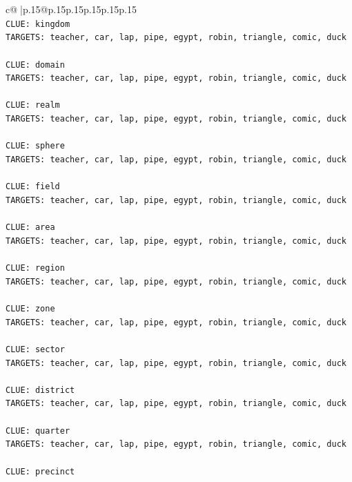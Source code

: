 \documentclass{article}
\begin{document}
{\begin{supertabular}{c@{$\;$}|p{.15\linewidth}@{}p{.15\linewidth}p{.15\linewidth}p{.15\linewidth}p{.15\linewidth}p{.15\linewidth}}
{{{\\ 
\texttt{CLUE: kingdom} \\
\texttt{TARGETS: teacher, car, lap, pipe, egypt, robin, triangle, comic, duck} \\
\\ 
\texttt{CLUE: domain} \\
\texttt{TARGETS: teacher, car, lap, pipe, egypt, robin, triangle, comic, duck} \\
\\ 
\texttt{CLUE: realm} \\
\texttt{TARGETS: teacher, car, lap, pipe, egypt, robin, triangle, comic, duck} \\
\\ 
\texttt{CLUE: sphere} \\
\texttt{TARGETS: teacher, car, lap, pipe, egypt, robin, triangle, comic, duck} \\
\\ 
\texttt{CLUE: field} \\
\texttt{TARGETS: teacher, car, lap, pipe, egypt, robin, triangle, comic, duck} \\
\\ 
\texttt{CLUE: area} \\
\texttt{TARGETS: teacher, car, lap, pipe, egypt, robin, triangle, comic, duck} \\
\\ 
\texttt{CLUE: region} \\
\texttt{TARGETS: teacher, car, lap, pipe, egypt, robin, triangle, comic, duck} \\
\\ 
\texttt{CLUE: zone} \\
\texttt{TARGETS: teacher, car, lap, pipe, egypt, robin, triangle, comic, duck} \\
\\ 
\texttt{CLUE: sector} \\
\texttt{TARGETS: teacher, car, lap, pipe, egypt, robin, triangle, comic, duck} \\
\\ 
\texttt{CLUE: district} \\
\texttt{TARGETS: teacher, car, lap, pipe, egypt, robin, triangle, comic, duck} \\
\\ 
\texttt{CLUE: quarter} \\
\texttt{TARGETS: teacher, car, lap, pipe, egypt, robin, triangle, comic, duck} \\
\\ 
\texttt{CLUE: precinct} \\
}}}
\end{supertabular}}
\end{document}
